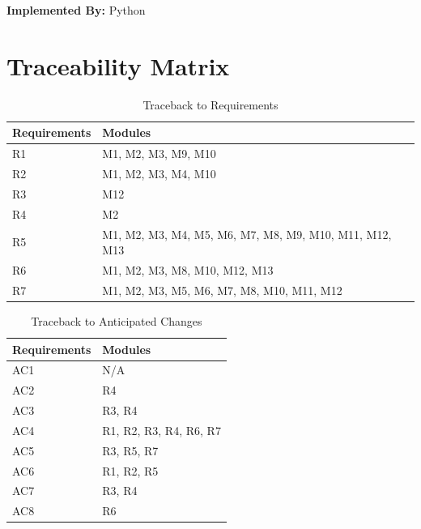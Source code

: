 \documentclass[titlepage]{article}
\begin{document}
\textbf{Implemented By:}
Python

\section{Traceability Matrix}
\begin{table}[h!]
\centering
    \begin{tabular}{| p{5cm} | p{5cm} |}    \hline
    Requirements &Modules\\ \hline
    
      R1  &M1, M2, M3, M9, M10 \\ \hline
      R2  &M1, M2, M3, M4, M10 \\ \hline
      R3  &M12 \\ \hline
      R4  &M2 \\ \hline
      R5  &M1, M2, M3, M4, M5, M6, M7, M8, M9, M10, M11, M12, M13 \\ \hline
      R6  &M1, M2, M3, M8, M10, M12, M13 \\ \hline
      R7  &M1, M2, M3, M5, M6, M7, M8, M10, M11, M12 \\ \hline
      
    \end{tabular}
    \caption{Traceback to Requirements}
\label{table:Traceback to Requirements}
\end{table}

\begin{table}[h!]
\centering
    \begin{tabular}{| p{5cm} | p{5cm} |}    \hline
    Requirements &Modules\\ \hline
    
      AC1  & N/A\\ \hline
      AC2  & R4\\ \hline
      AC3  & R3, R4\\ \hline
      AC4  & R1, R2, R3, R4, R6, R7\\ \hline
      AC5  & R3, R5, R7\\ \hline
      AC6  & R1, R2, R5\\ \hline
      AC7  & R3, R4\\ \hline
      AC8  & R6\\ \hline
      
    \end{tabular}
    \caption{Traceback to Anticipated Changes}
\label{table:Traceback to Anticipated Changes}
\end{table}

\pagebreak
\end{document}
